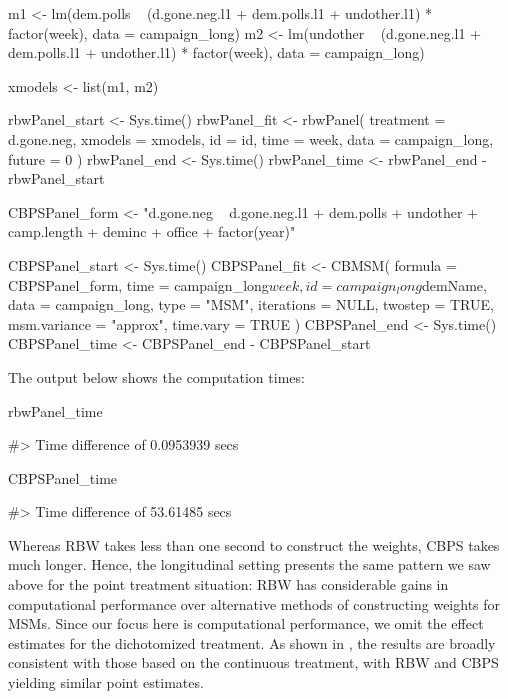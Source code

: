 \begin{Schunk}
\begin{Sinput}
m1 <-
  lm(dem.polls ~ (d.gone.neg.l1 + dem.polls.l1 + undother.l1) * factor(week),
     data = campaign_long)
m2 <-
  lm(undother ~ (d.gone.neg.l1 + dem.polls.l1 + undother.l1) * factor(week),
     data = campaign_long)

xmodels <- list(m1, m2)

rbwPanel_start <- Sys.time()
rbwPanel_fit <- rbwPanel(
  treatment = d.gone.neg,
  xmodels = xmodels,
  id = id,
  time = week,
  data = campaign_long,
  future = 0
)
rbwPanel_end <- Sys.time()
rbwPanel_time <- rbwPanel_end - rbwPanel_start
\end{Sinput}
\end{Schunk}

\begin{Schunk}
\begin{Sinput}
CBPSPanel_form <-
  "d.gone.neg ~ d.gone.neg.l1 + dem.polls + undother + camp.length + deminc + office + factor(year)"

CBPSPanel_start <- Sys.time()
CBPSPanel_fit <-
  CBMSM(
    formula = CBPSPanel_form,
    time = campaign_long$week,
    id = campaign_long$demName,
    data = campaign_long,
    type = "MSM",
    iterations = NULL,
    twostep = TRUE,
    msm.variance = "approx",
    time.vary = TRUE
  )
CBPSPanel_end <- Sys.time()
CBPSPanel_time <- CBPSPanel_end - CBPSPanel_start
\end{Sinput}
\end{Schunk}

The output below shows the computation times:

\begin{Schunk}
\begin{Sinput}
rbwPanel_time
\end{Sinput}
\begin{Soutput}
#> Time difference of 0.0953939 secs
\end{Soutput}
\begin{Sinput}
CBPSPanel_time
\end{Sinput}
\begin{Soutput}
#> Time difference of 53.61485 secs
\end{Soutput}
\end{Schunk}

Whereas RBW takes less than one second to construct the weights, CBPS
takes much longer. Hence, the longitudinal setting presents the same
pattern we saw above for the point treatment situation: RBW has
considerable gains in computational performance over alternative methods
of constructing weights for MSMs. Since our focus here is computational
performance, we omit the effect estimates for the dichotomized
treatment. As shown in \citet{zhouResidualBalancingMethod2020a}, the
results are broadly consistent with those based on the continuous
treatment, with RBW and CBPS yielding similar point estimates.

